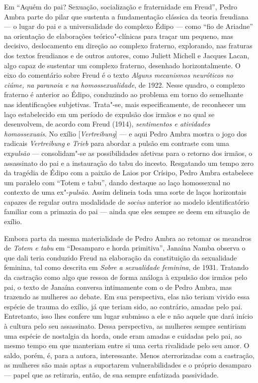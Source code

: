 Em ``Aquém do pai? Sexuação, socialização e fraternidade em Freud'',
Pedro Ambra parte do pilar que sustenta a fundamentação clássica da
teoria freudiana --- o lugar do pai e a universalidade do complexo Édipo
--- como ``fio de Ariadne'' na orientação de elaborações teórico"-clínicas
para traçar um pequeno, mas decisivo, deslocamento em direção ao
complexo fraterno, explorando, nas fraturas dos textos freudianos e de
outros autores, como Juliett Michell e Jacques Lacan, algo capaz de
sustentar um complexo fraterno, desenhado horizontalmente. O eixo do
comentário sobre Freud é o texto \emph{Alguns mecanismos neuróticos no
ciúme, na paranoia e na homossexualidade}, de 1922. Nesse quadro, o
complexo fraterno é anterior ao Édipo, conduzindo ao problema em torno
do semelhante nas identificações subjetivas. Trata"-se, mais
especificamente, de reconhecer um laço estabelecido em um período de
expulsão dos irmãos e no qual se desenvolvem, de acordo com Freud
(1914), \emph{sentimentos e atividades homossexuais}. No exílio
{[}\emph{Vertreibung}{]} --- e aqui Pedro Ambra mostra o jogo dos
radicais \emph{Vertreibung} e \emph{Trieb} para abordar a pulsão em
contraste com uma ex\emph{pulsão} --- consolidam"-se as possibilidades
afetivas para o retorno dos irmãos, o assassinato do pai e a instauração
do tabu do incesto. Resgatando um tempo zero da tragédia de Édipo com a
paixão de Laios por Crísipo, Pedro Ambra estabelece um paralelo com
``Totem e tabu'', dando destaque ao laço homossexual no contexto de uma
ex"-\emph{pulsão}. Assim delineia toda uma sorte de laços horizontais
capazes de regular outra modalidade de \emph{socius} anterior ao modelo
identificatório familiar com a primazia do pai --- ainda que eles sempre
se deem em situação de exílio.

Embora parta da mesma materialidade de Pedro Ambra ao retomar os
meandros de \emph{Totem e tabu} em ``Desamparo e horda primitiva'',
Janaína Namba observa o que dali teria conduzido Freud na elaboração da
constituição da sexualidade feminina, tal como descrita em \emph{Sobre a
sexualidade feminina}, de 1931. Tratando da castração como algo que
ressoa de forma análoga à expulsão dos irmãos pelo pai, o texto de
Janaína conversa intimamente com o de Pedro Ambra, mas trazendo as
mulheres ao debate. Em sua perspectiva, elas não teriam vivido essa
espécie de trauma do exílio, já que teriam sido, ao contrário, amadas
pelo pai. Entretanto, isso lhes confere um lugar submisso a ele e não
aquele que dará início à cultura pelo seu assassinato. Dessa
perspectiva, as mulheres sempre sentiriam uma espécie de nostalgia da
horda, onde eram amadas e cuidadas pelo pai, ao mesmo tempo em que
manteriam entre si uma certa rivalidade pelo seu amor. O saldo, porém,
é, para a autora, interessante. Menos aterrorizadas com a castração, as
mulheres são mais aptas a suportarem vulnerabilidades e o próprio
desamparo --- papel que as retiraria, então, de sua sempre enfatizada
passividade.

